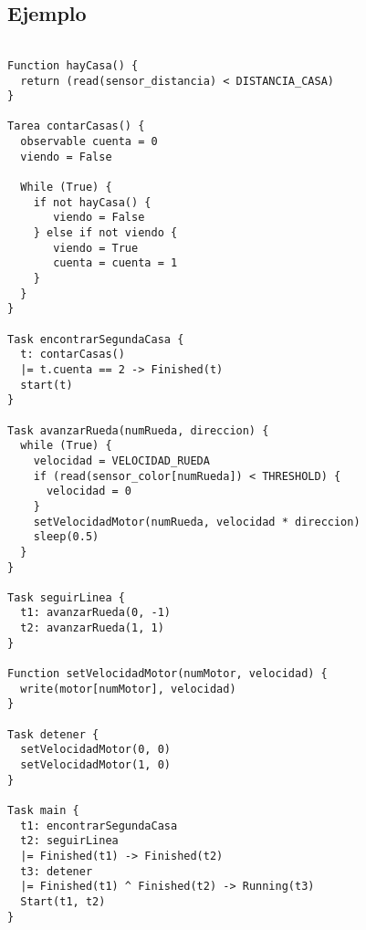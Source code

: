 \subsection{Ejemplo}

\begin{verbatim}

Function hayCasa() {
  return (read(sensor_distancia) < DISTANCIA_CASA)
}

Tarea contarCasas() {
  observable cuenta = 0
  viendo = False

  While (True) {
    if not hayCasa() {
       viendo = False
    } else if not viendo {
       viendo = True
       cuenta = cuenta = 1
    }
  }
}

Task encontrarSegundaCasa {
  t: contarCasas()
  |= t.cuenta == 2 -> Finished(t)
  start(t)
}

Task avanzarRueda(numRueda, direccion) {
  while (True) {
    velocidad = VELOCIDAD_RUEDA
    if (read(sensor_color[numRueda]) < THRESHOLD) {
      velocidad = 0
    }
    setVelocidadMotor(numRueda, velocidad * direccion)
    sleep(0.5)
  }
}

Task seguirLinea {
  t1: avanzarRueda(0, -1)
  t2: avanzarRueda(1, 1)
}

Function setVelocidadMotor(numMotor, velocidad) {
  write(motor[numMotor], velocidad)
}

Task detener {
  setVelocidadMotor(0, 0)
  setVelocidadMotor(1, 0)
}

Task main {
  t1: encontrarSegundaCasa
  t2: seguirLinea
  |= Finished(t1) -> Finished(t2)
  t3: detener
  |= Finished(t1) ^ Finished(t2) -> Running(t3)
  Start(t1, t2)
}

\end{verbatim}
